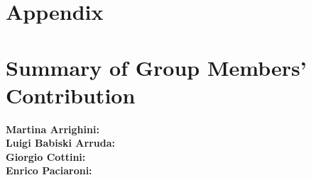 \documentclass[12pt, openright, twoside]{report}
\begin{document}
\section*{Appendix}

\section*{Summary of Group Members' Contribution}

\textbf{Martina Arrighini:}\\
\textbf{Luigi Babiski Arruda:}\\ 
\textbf{Giorgio Cottini:}\\
\textbf{Enrico Paciaroni:}\\

\end{document}

